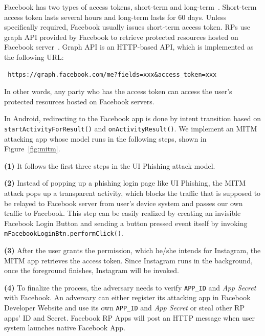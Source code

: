 \documentclass[letterpaper,12pt]{article}
\begin{document}
Facebook has two types of access tokens, short-term and
long-term~\cite{fbaccesstoken}. Short-term access token lasts several
hours and long-term lasts for 60 days. Unless specifically required,
Facebook usually issues short-term access token. RPs use graph API
provided by Facebook to retrieve protected resources hosted on
Facebook server~\cite{graphapi}. Graph API is an HTTP-based API, which
is implemented as the following URL:
 \begin{lstlisting}
 https://graph.facebook.com/me?fields=xxx&access_token=xxx
 \end{lstlisting}

In other words, any party who has the access token can access the
user's protected resources hosted on Facebook servers.

In Android, redirecting to the Facebook app is done by intent
transition based on \texttt{startActivityForResult()} and
\texttt{onActivityResult()}.  We implement an MITM attacking app whose
model runs in the following steps, shown in Figure~\ref{fig:mitm}.

\textbf{(1)} It follows the first three steps in the UI Phishing
attack model.

\textbf{(2)} Instead of popping up a phishing login
page like UI Phishing, the MITM attack pops up a transparent activity,
which blocks the traffic that is supposed to be relayed to Facebook
server from user's device system and passes our own traffic to
Facebook. This step can be easily realized by creating an invisible
Facebook Login Button and sending a button pressed event itself by
invoking \texttt{mFacebookLoginBtn.performClick()}.

\textbf{(3)} After the user grants the permission, which he/she
intends for Instagram, the MITM app retrieves the access token. Since
Instagram runs in the background, once the foreground finishes,
Instagram will be invoked.


\textbf{(4)} To finalize the process, the adversary needs to verify
\texttt{APP\_ID} and \emph{App Secret} with Facebook. An adversary can
either register its attacking app in Facebook Developer Website and
use its own \texttt{APP\_ID} and \emph{App Secret} or steal other RP
apps' ID and Secret. Facebook RP Apps will post an HTTP message when
user system launches native Facebook App.
\end{document}
